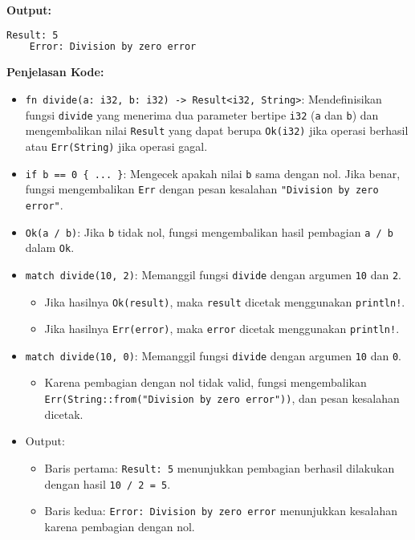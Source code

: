 \textbf{Output:}
\begin{lstlisting}[language=bash, caption={Output Program Result Enum}]
	Result: 5
	Error: Division by zero error
\end{lstlisting}

\textbf{Penjelasan Kode:}
\begin{itemize}
	\item \texttt{fn divide(a: i32, b: i32) -> Result<i32, String>}: Mendefinisikan fungsi \texttt{divide} yang menerima dua parameter bertipe \texttt{i32} (\texttt{a} dan \texttt{b}) dan mengembalikan nilai \texttt{Result} yang dapat berupa \texttt{Ok(i32)} jika operasi berhasil atau \texttt{Err(String)} jika operasi gagal.
	\item \texttt{if b == 0 \{ ... \}}: Mengecek apakah nilai \texttt{b} sama dengan nol. Jika benar, fungsi mengembalikan \texttt{Err} dengan pesan kesalahan \texttt{"Division by zero error"}.
	\item \texttt{Ok(a / b)}: Jika \texttt{b} tidak nol, fungsi mengembalikan hasil pembagian \texttt{a / b} dalam \texttt{Ok}.
	\item \texttt{match divide(10, 2)}: Memanggil fungsi \texttt{divide} dengan argumen \texttt{10} dan \texttt{2}.
	\begin{itemize}
		\item Jika hasilnya \texttt{Ok(result)}, maka \texttt{result} dicetak menggunakan \texttt{println!}.
		\item Jika hasilnya \texttt{Err(error)}, maka \texttt{error} dicetak menggunakan \texttt{println!}.
	\end{itemize}
	\item \texttt{match divide(10, 0)}: Memanggil fungsi \texttt{divide} dengan argumen \texttt{10} dan \texttt{0}.
	\begin{itemize}
		\item Karena pembagian dengan nol tidak valid, fungsi mengembalikan \texttt{Err(String::from("Division by zero error"))}, dan pesan kesalahan dicetak.
	\end{itemize}
	\item Output:
	\begin{itemize}
		\item Baris pertama: \texttt{Result: 5} menunjukkan pembagian berhasil dilakukan dengan hasil \texttt{10 / 2 = 5}.
		\item Baris kedua: \texttt{Error: Division by zero error} menunjukkan kesalahan karena pembagian dengan nol.
	\end{itemize}
\end{itemize}

